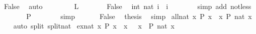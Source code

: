 \begin{isabellebody}
\ False\ \isamarkupfalse%
\ auto\isanewline
\ \ \isamarkupfalse%
\isanewline
\ \ \ \ \isamarkupfalse%
\ {\isacharquery}{\kern0pt}L\isanewline
\ \ \ \ \isamarkupfalse%
\ \isamarkupfalse%
\ False\ \isamarkupfalse%
\ {\isachardoublequoteopen}int\ {\isacharparenleft}{\kern0pt}nat\ i{\isacharparenright}{\kern0pt}\ {\isacharequal}{\kern0pt}\ i{\isachardoublequoteclose}\isanewline
\ \ \ \ \ \ \isamarkupfalse%
\ {\isacharparenleft}{\kern0pt}simp\ add{\isacharcolon}{\kern0pt}\ not{\isacharunderscore}{\kern0pt}less{\isacharparenright}{\kern0pt}\isanewline
\ \ \ \ \isamarkupfalse%
\ \isamarkupfalse%
\ {\isacharquery}{\kern0pt}P\isanewline
\ \ \ \ \ \ \isamarkupfalse%
\ simp\isanewline
\ \ \isamarkupfalse%
\isanewline
\ \ \isamarkupfalse%
\ False\ \isamarkupfalse%
\ {\isacharquery}{\kern0pt}thesis\ \isamarkupfalse%
\ simp\isanewline
{}\isamarkupfalse%
%
\endisatagproof
{\isafoldproof}%
%
\isadelimproof
\isanewline
%
\endisadelimproof
\isanewline
{}\isamarkupfalse%
\ all{\isacharunderscore}{\kern0pt}nat{\isacharcolon}{\kern0pt}\ {\isachardoublequoteopen}{\isacharparenleft}{\kern0pt}{\isasymforall}x{\isachardot}{\kern0pt}\ P\ x{\isacharparenright}{\kern0pt}\ {\isasymlongleftrightarrow}\ {\isacharparenleft}{\kern0pt}{\isasymforall}x{\isasymge}{}{\isachardot}{\kern0pt}\ P\ {\isacharparenleft}{\kern0pt}nat\ x{\isacharparenright}{\kern0pt}{\isacharparenright}{\kern0pt}{\isachardoublequoteclose}\isanewline
%
\isadelimproof
\ \ %
\endisadelimproof
%
\isatagproof
{}\isamarkupfalse%
\ {\isacharparenleft}{\kern0pt}auto\ split{\isacharcolon}{\kern0pt}\ split{\isacharunderscore}{\kern0pt}nat{\isacharparenright}{\kern0pt}%
\endisatagproof
{\isafoldproof}%
%
\isadelimproof
\isanewline
%
\endisadelimproof
\isanewline
{}\isamarkupfalse%
\ ex{\isacharunderscore}{\kern0pt}nat{\isacharcolon}{\kern0pt}\ {\isachardoublequoteopen}{\isacharparenleft}{\kern0pt}{\isasymexists}x{\isachardot}{\kern0pt}\ P\ x{\isacharparenright}{\kern0pt}\ {\isasymlongleftrightarrow}\ {\isacharparenleft}{\kern0pt}{\isasymexists}x{\isachardot}{\kern0pt}\ {}\ {\isasymle}\ x\ {\isasymand}\ P\ {\isacharparenleft}{\kern0pt}nat\ x{\isacharparenright}{\kern0pt}{\isacharparenright}{\kern0pt}{\isachardoublequoteclose}\isanewline
%
\isadelimproof
%
\endisadelimproof
%
\isatagproof
{}\isamarkupfalse%

\end{isabellebody}
